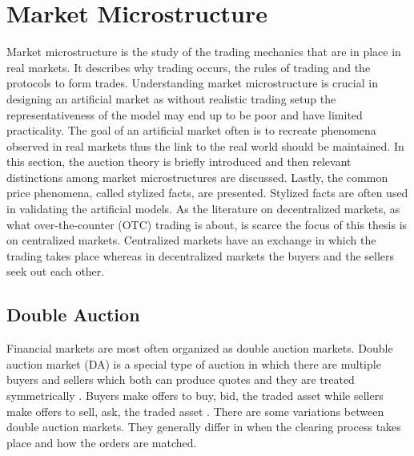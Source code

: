 \section{Market Microstructure}

Market microstructure is the study of the trading mechanics that are in place 
in real markets. It describes why trading occurs, the rules of trading 
and the protocols to form trades. \citep[p. 3-4]{Has07}
Understanding market microstructure is crucial in designing an artificial market
as without realistic trading setup the representativeness of the model may end
up to be poor and have limited practicality. The goal of an artificial market often
is to recreate phenomena observed in real markets thus the link to the real world 
should be maintained. In this section, the auction theory is briefly introduced and 
then relevant distinctions among market microstructures are discussed. 
Lastly, the common price phenomena, called stylized facts, are presented. Stylized facts
are often used in validating the artificial models. As the literature on decentralized 
markets, as what over-the-counter (OTC) trading is about, is scarce the focus of this thesis is 
on centralized markets. Centralized markets have an exchange in which the trading takes place 
whereas in decentralized markets the buyers and the sellers seek out each other.


\subsection{Double Auction}

Financial markets are most often organized as double auction markets.
Double auction market (DA) is a special type of auction in which there
are multiple buyers and sellers which both can 
produce quotes and they are treated symmetrically \citep*{Kle99}. Buyers
make offers to buy, bid, the traded asset while sellers make offers
to sell, ask, the traded asset \citep*{Moc15}. There are some variations 
between double auction markets. They generally differ in when the clearing process takes place 
and how the orders are matched. 


